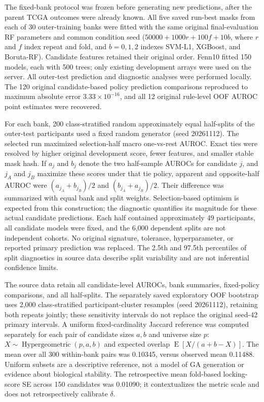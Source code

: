 The fixed-bank protocol was frozen before generating new predictions, after the parent TCGA outcomes were already known. All five saved run-best masks from each of 30 outer-training banks were fitted with the same original final-evaluation RF parameters and common condition seed ($50000+1000r+100f+10b$, where $r$ and $f$ index repeat and fold, and $b=0,1,2$ indexes SVM-L1, XGBoost, and Boruta-RF). Candidate features retained their original order. Fenn10 fitted 150 models, each with 500 trees; only existing development arrays were used on the server. All outer-test prediction and diagnostic analyses were performed locally. The 120 original candidate-based policy prediction comparisons reproduced to maximum absolute error $3.33\times10^{-16}$, and all 12 original rule-level OOF AUROC point estimates were recovered.

For each bank, 200 class-stratified random approximately equal half-splits of the outer-test participants used a fixed random generator (seed 20261112). The selected run maximized selection-half macro one-vs-rest AUROC. Exact ties were resolved by higher original development score, fewer features, and smaller stable mask hash. If $a_j$ and $b_j$ denote the two half-sample AUROCs for candidate $j$, and $j_A$ and $j_B$ maximize these scores under that tie policy, apparent and opposite-half AUROC were $(a_{j_A}+b_{j_B})/2$ and $(b_{j_A}+a_{j_B})/2$. Their difference was summarized with equal bank and split weights. Selection-based optimism is expected from this construction; the diagnostic quantifies its magnitude for these actual candidate predictions. Each half contained approximately 49 participants, all candidate models were fixed, and the 6,000 dependent splits are not independent cohorts. No original signature, tolerance, hyperparameter, or reported primary prediction was replaced. The 2.5th and 97.5th percentiles of split diagnostics in source data describe split variability and are not inferential confidence limits.

The source data retain all candidate-level AUROCs, bank summaries, fixed-policy comparisons, and all half-splits. The separately saved exploratory OOF bootstrap uses 2,000 class-stratified participant-cluster resamples (seed 20261112), retaining both repeats jointly; these sensitivity intervals do not replace the original seed-42 primary intervals. A uniform fixed-cardinality Jaccard reference was computed separately for each pair of candidate sizes $a,b$ and universe size $p$: $X\sim\operatorname{Hypergeometric}(p,a,b)$ and expected overlap $\operatorname{E}[X/(a+b-X)]$. The mean over all 300 within-bank pairs was 0.10345, versus observed mean 0.11488. Uniform subsets are a descriptive reference, not a model of GA generation or evidence about biological stability. The retrospective mean fold-based locking-score SE across 150 candidates was 0.01090; it contextualizes the metric scale and does not retrospectively calibrate $\delta$.

